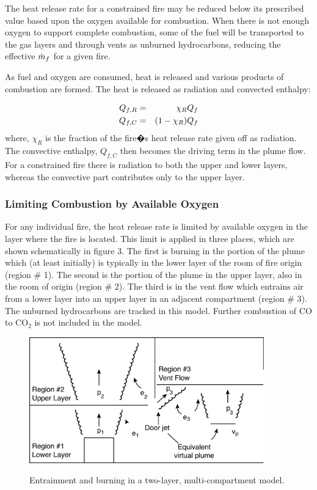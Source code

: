 The heat release rate for a constrained fire may be reduced below its prescribed value based upon the oxygen available for combustion.  When there is not enough oxygen to support complete combustion, some of the fuel will be transported to the gas layers and through vents as unburned hydrocarbons, reducing the effective $\dot{m}_f$ for a given fire.

As fuel and oxygen are consumed, heat is released and various products of combustion are formed. The heat is released as radiation and convected enthalpy:

\begin{eqnarray} Q_{f,R} &=& \chi_R Q_f \\
Q_{f,C} &=& { \left( {1-\chi_R} \right) } Q_f
\end{eqnarray}
where, $\chi_R$ is the fraction  of the fire�s heat release rate given off as radiation.  The convective
enthalpy, $Q_{f,C}$ then becomes the driving term in the plume flow.  For a constrained fire there is
radiation to both the upper and lower layers, whereas the convective part contributes only to the
upper layer.

\subsubsection{Limiting Combustion by Available Oxygen \label{sec:Oxygen_Limit}}

For any individual fire, the heat release rate is limited by available oxygen in the layer where the fire is located. This limit is applied in three
places, which are shown schematically in figure 3. The first is burning in the portion of the
plume which (at least initially) is typically in the lower layer of the room of fire origin (region \# 1).  The second is the portion of the plume in the upper layer, also in the room of origin (region \# 2).  The third is in the
vent flow which entrains air from a lower layer into an upper layer in an adjacent compartment
(region \# 3). The unburned hydrocarbons are tracked in this model.  Further combustion of CO to
$\mathrm{CO_2}$ is not included in the model.

\begin{figure}[h]
\begin{center}
\includegraphics[width=4.0in]{FIGURES/Theory/Fire_entrain}\\
\end{center}
\caption{Entrainment and burning in a two-layer, multi-compartment model.}
 \label{fig:Burning_Regions}
\end{figure}

